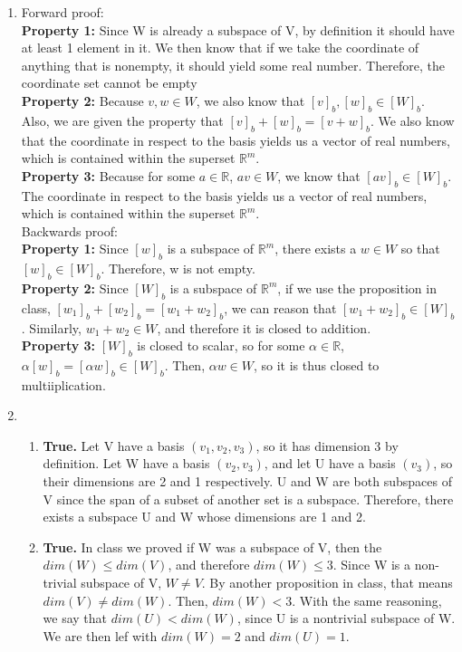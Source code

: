 \documentclass{article}
\begin{document}
\begin{enumerate}
\item Forward proof: \\ \textbf{Property 1:} Since W is already a subspace of V, by definition it should have at least 1 element in it. We then know that if we take the coordinate of anything that is nonempty, it should yield some real number. Therefore, the coordinate set cannot be empty \\ \textbf{Property 2:} Because $v,w \in W$, we also know that $[v]_b, [w]_b \in [W]_b$. Also, we are given the property that $[v]_b + [w]_b = [v + w]_b$. We also know that the coordinate in respect to the basis yields us a vector of real numbers, which is contained within the superset $\mathbb{R}^m$. \\ \textbf{Property 3:} Because for some $a \in \mathbb{R}$, $av \in W$, we know that $[av]_b \in [W]_b$. The coordinate in respect to the basis yields us a vector of real numbers, which is contained within the superset $\mathbb{R}^m$. \\
Backwards proof: \\ \textbf{Property 1:} Since $[w]_b$ is a subspace of $\mathbb{R}^m$, there exists a $w \in W$ so that $[w]_b \in [W]_b$. Therefore, w is not empty. \\ \textbf{Property 2:} Since $[W]_b$ is a subspace of $\mathbb{R}^m$, if we use the proposition in class, $[w_1]_b + [w_2]_b = [w_1 + w_2]_b$, we can reason that $[w_1 + w_2]_b \in [W]_b$. Similarly, $w_1 + w_2 \in W$, and therefore it is closed to addition. \\ \textbf{Property 3:} $[W]_b$ is closed to scalar, so for some $\alpha \in \mathbb{R}$, $\alpha[w]_b = [\alpha w]_b \in [W]_b$. Then, $\alpha w \in W$, so it is thus closed to multiiplication.

\item

\begin{enumerate}

\item \textbf{True.} Let V have a basis $(v_1,v_2,v_3)$, so it has dimension 3 by definition. Let W have a basis $(v_2, v_3)$, and let U have a basis $(v_3)$, so their dimensions are 2 and 1 respectively. U and W are both subspaces of V since the span of a subset of another set is a subspace. Therefore, there exists a subspace U and W whose dimensions are 1 and 2.

\item \textbf{True.} In class we proved if W was a subspace of V, then the $dim(W) \leq dim(V)$, and therefore $dim(W) \leq 3$. Since W is a non-trivial subspace of V, $W \neq V$. By another proposition in class, that means $dim(V) \neq dim(W)$. Then, $dim(W) < 3$. With the same reasoning, we say that $dim(U) < dim(W)$, since U is a nontrivial subspace of W. We are then lef with $dim(W) = 2$ and $dim(U) = 1$.


\end{enumerate}
\end{enumerate}
\end{document}
